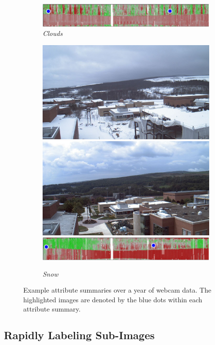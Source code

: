 \documentclass[10pt,twocolumn,letterpaper]{article}
\begin{document}
\begin{figure}
\begin{subfigure}[b]{\columnwidth}
		\includegraphics[width=\columnwidth]{figs/cam_summary/00000623_clouds.pdf}
    \caption{\emph{Clouds}}
    \label{fig:clouds}
	\end{subfigure}	
  \begin{subfigure}[b]{\columnwidth}
    \centering
		\includegraphics[width=0.49\columnwidth]{figs/cam_summary/260_01011844.jpg}
		\includegraphics[width=0.49\columnwidth]{figs/cam_summary/260_09011714.jpg}
    \includegraphics[width=\columnwidth]{figs/cam_summary/00000260_snow.pdf}
    \caption{\emph{Snow}}
    \label{fig:snow}
	\end{subfigure}	
	\caption{Example attribute summaries over a year of webcam data.  The highlighted
           images are denoted by the blue dots within each attribute summary.}
	\label{fig:webcam_summary}
\end{figure}



\subsection{Rapidly Labeling Sub-Images}
\end{document}
